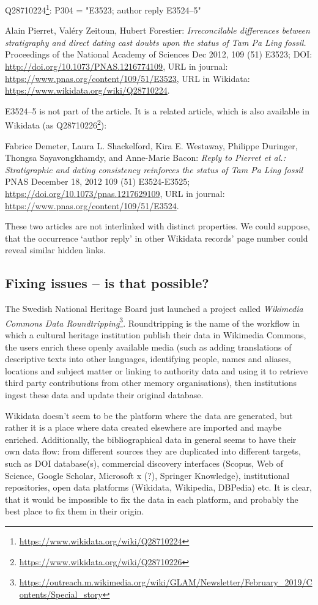 Q28710224\footnote{\url{https://www.wikidata.org/wiki/Q28710224}}: P304 = "E3523; author reply E3524–5"

Alain Pierret, Valéry Zeitoun, Hubert Forestier: \emph{Irreconcilable differences between stratigraphy and direct dating cast doubts upon the status of Tam Pa Ling fossil.} Proceedings of the National Academy of Sciences Dec 2012, 109 (51) E3523; DOI: \url{http://doi.org/10.1073/PNAS.1216774109}, URL in journal: \url{https://www.pnas.org/content/109/51/E3523}, URL in Wikidata: \url{https://www.wikidata.org/wiki/Q28710224}.

E3524–5 is not part of the article. It is a related article, which is also available in Wikidata (as Q28710226\footnote{\url{https://www.wikidata.org/wiki/Q28710226}}):

Fabrice Demeter, Laura L. Shackelford, Kira E. Westaway, Philippe Duringer, Thongsa Sayavongkhamdy, and Anne-Marie Bacon: \emph{Reply to Pierret et al.: Stratigraphic and dating consistency reinforces the status of Tam Pa Ling fossil} PNAS December 18, 2012 109 (51) E3524-E3525; \url{https://doi.org/10.1073/pnas.1217629109}, URL in journal: \url{https://www.pnas.org/content/109/51/E3524}.

These two articles are not interlinked with distinct properties. We could suppose, that the occurrence `author reply' in other Wikidata records' page number could reveal similar hidden links.

\subsection{Fixing issues -- is that possible?}

The Swedish National Heritage Board just launched a project called \emph{Wikimedia Commons Data Roundtripping}\footnote{\url{https://outreach.m.wikimedia.org/wiki/GLAM/Newsletter/February_2019/Contents/Special_story}}. Roundtripping is the name of the workflow in which a cultural heritage institution publish their data in Wikimedia Commons, the users enrich these openly available media (such as adding translations of descriptive texts into other languages, identifying people, names and aliases, locations and subject matter or linking to authority data and using it to retrieve third party contributions from other memory organisations), then institutions ingest these data and update their original database.

Wikidata doesn't seem to be the platform where the data are generated, but rather it is a place where data created elsewhere are imported and maybe enriched. Additionally, the bibliographical data in general seems to have their own data flow: from different sources they are duplicated into different targets, such as DOI database(s), commercial discovery interfaces (Scopus, Web of Science, Google Scholar, Microsoft x (?), Springer Knowledge), institutional repositories, open data platforms (Wikidata, Wikipedia, DBPedia) etc. It is clear, that it would be impossible to fix the data in each platform, and probably the best place to fix them in their origin.

